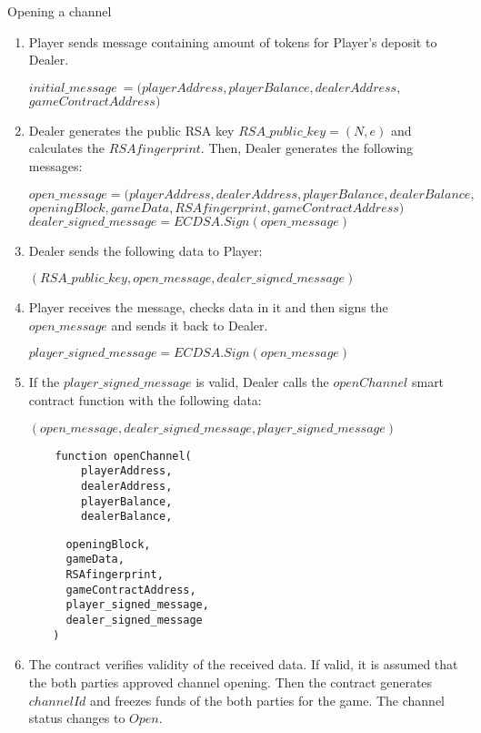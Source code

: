 \begin{algorithm}
\caption{Opening a channel} \label{alg:openchannel}
\begin{enumerate}
	\item Player sends message containing amount of tokens for Player's deposit to Dealer.
\begin{center}
	 $initial\_message\ = (playerAddress, playerBalance, dealerAddress,$\\$ gameContractAddress)$
\end{center}
	\item Dealer generates the public RSA key $RSA\_public\_key= (N,e)$ and calculates the $RSAfingerprint$. Then, Dealer generates the following messages:
\begin{center}
	 $open\_message = (playerAddress,  dealerAddress, playerBalance, dealerBalance,$\\$openingBlock, gameData, RSAfingerprint, gameContractAddress)$
	$dealer\_signed\_message = ECDSA.Sign(open\_message)$
\end{center}
	\item Dealer sends the following data to Player:
\begin{center}
$(RSA\_public\_key, open\_message,dealer\_signed\_message)$
\end{center}
	\item Player receives the message, checks data in it and then signs the $open\_message$ and sends it back to Dealer.
\begin{center}
	$player\_signed\_message = ECDSA.Sign(open\_message)$
\end{center}
\item If the $player\_signed\_message$ is valid, Dealer calls the $openChannel$ smart contract function with the following data:
\begin{center}
$(open\_message,dealer\_signed\_message,player\_signed\_message)$
\end{center}	
\begin{lstlisting}
    function openChannel(
        playerAddress,
        dealerAddress,
        playerBalance,
        dealerBalance,
\end{lstlisting}
\end{enumerate}
\end{algorithm}
\begin{algorithm}
\begin{lstlisting}
	     openingBlock,
	     gameData,
	     RSAfingerprint,
	     gameContractAddress,
	     player_signed_message,
 	     dealer_signed_message
 	   )
\end{lstlisting}
\begin{enumerate}
\setcounter{enumi}{5}
\item The contract verifies validity of the received data. If valid, it is assumed that the both parties approved channel opening. Then the contract generates $channelId$ and freezes funds of the both parties for the game. The channel status changes to $Open$. 
\end{enumerate}
\end{algorithm}

